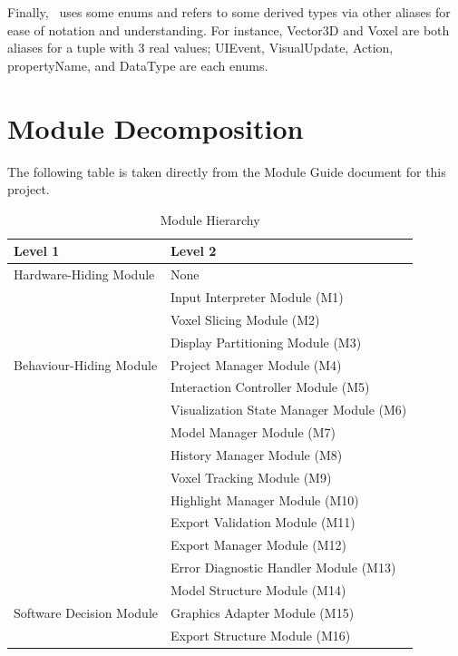 \documentclass[12pt, titlepage]{article}
\begin{document}
Finally, \progname \ uses some enums and refers to some derived types via other aliases for 
ease of notation and understanding. For instance, Vector3D and Voxel are both aliases for a tuple
with 3 real values; UIEvent, VisualUpdate, Action, propertyName, and DataType are each enums.  

\section{Module Decomposition}

The following table is taken directly from the Module Guide document for this project.

\begin{table}[h!]
  \centering
  \caption{Module Hierarchy}\label{TblMH}
  \begin{tabular}{p{} p{}}
  \toprule
  \textbf{Level 1} & \textbf{Level 2}\\
  \midrule
  
  {Hardware-Hiding Module} & None \\
  \midrule
  
  \multirow{7}{0.3\textwidth}{Behaviour-Hiding Module} & Input Interpreter Module (M1)\\
  & Voxel Slicing Module (M2)\\
  & Display Partitioning Module (M3)\\
  & Project Manager Module (M4)\\
  & Interaction Controller Module (M5)\\
  & Visualization State Manager Module (M6)\\
  & Model Manager Module (M7)\\
  & History Manager Module (M8)\\
  & Voxel Tracking Module (M9)\\
  & Highlight Manager Module (M10)\\
  & Export Validation Module (M11)\\
  & Export Manager Module (M12)\\
  & Error Diagnostic Handler Module (M13)\\
  \midrule
  
  \multirow{3}{0.3\textwidth}{Software Decision Module} 
  & Model Structure Module (M14)\\
  & Graphics Adapter Module (M15)\\
  & Export Structure Module (M16)\\
  \bottomrule
  
  \end{tabular}
  \end{table}
\newpage
\end{document}
